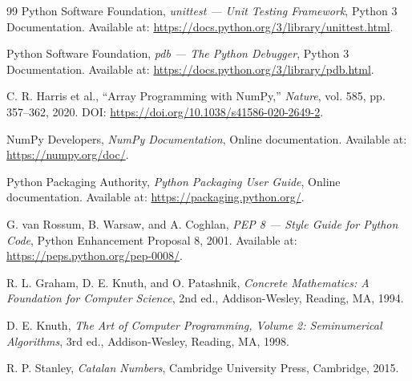 \documentclass[b5paper, utf8, 11pt, colorlinks]{book}
\begin{document}
\begin{thebibliography}{99}
	Python Software Foundation,
	\textit{unittest --- Unit Testing Framework},
	Python 3 Documentation.
	Available at:
	\url{https://docs.python.org/3/library/unittest.html}.
	
	Python Software Foundation,
	\textit{pdb --- The Python Debugger},
	Python 3 Documentation.
	Available at:
	\url{https://docs.python.org/3/library/pdb.html}.
	
	
	
	C. R. Harris et al.,
	``Array Programming with NumPy,''
	\textit{Nature},
	vol. 585, pp. 357--362, 2020.
	DOI: \url{https://doi.org/10.1038/s41586-020-2649-2}.
	
	NumPy Developers,
	\textit{NumPy Documentation},
	Online documentation.
	Available at:
	\url{https://numpy.org/doc/}.
	
	Python Packaging Authority,
	\textit{Python Packaging User Guide},
	Online documentation.
	Available at:
	\url{https://packaging.python.org/}.
	
	G. van Rossum, B. Warsaw, and A. Coghlan,
	\textit{PEP 8 --- Style Guide for Python Code},
	Python Enhancement Proposal 8, 2001.
	Available at:
	\url{https://peps.python.org/pep-0008/}.
	
	
	
	R. L. Graham, D. E. Knuth, and O. Patashnik,
	\textit{Concrete Mathematics:
		A Foundation for Computer Science},
	2nd ed.,
	Addison-Wesley, Reading, MA, 1994.
	
	D. E. Knuth,
	\textit{The Art of Computer Programming, Volume 2:
		Seminumerical Algorithms},
	3rd ed.,
	Addison-Wesley, Reading, MA, 1998.
	
	R. P. Stanley,
	\textit{Catalan Numbers},
	Cambridge University Press, Cambridge, 2015.
	
\end{thebibliography}
\end{document}
